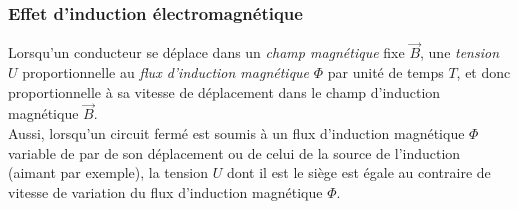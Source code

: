 \subsubsection{Effet d'induction électromagnétique}

Lorsqu'un conducteur se déplace dans un \emph{champ magnétique} fixe $\overrightarrow{B}$, une \emph{tension} $U$ proportionnelle au \emph{flux d'induction magnétique} $\Phi$ par unité de temps $T$, et donc proportionnelle à sa vitesse de déplacement dans le champ d'induction magnétique $\overrightarrow{B}$.\\
Aussi, lorsqu'un circuit fermé est soumis à un flux d'induction magnétique $\Phi$ variable de par de son déplacement ou de celui de la source de l'induction (aimant par exemple), la tension $U$ dont il est le siège est égale au contraire de vitesse de variation du flux d'induction magnétique $\Phi$.



